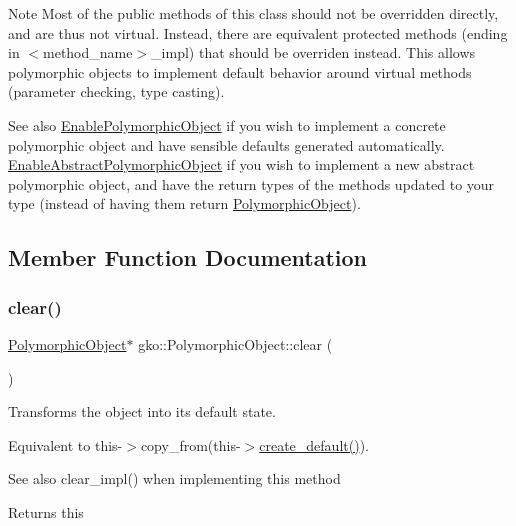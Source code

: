 \begin{DoxyNote}{Note}
Most of the public methods of this class should not be overridden directly, and are thus not virtual. Instead, there are equivalent protected methods (ending in $<$method\+\_\+name$>$\+\_\+impl) that should be overriden instead. This allows polymorphic objects to implement default behavior around virtual methods (parameter checking, type casting).
\end{DoxyNote}
\begin{DoxySeeAlso}{See also}
\hyperlink{classgko_1_1EnablePolymorphicObject}{Enable\+Polymorphic\+Object} if you wish to implement a concrete polymorphic object and have sensible defaults generated automatically. \hyperlink{classgko_1_1EnableAbstractPolymorphicObject}{Enable\+Abstract\+Polymorphic\+Object} if you wish to implement a new abstract polymorphic object, and have the return types of the methods updated to your type (instead of having them return \hyperlink{classgko_1_1PolymorphicObject}{Polymorphic\+Object}). 
\end{DoxySeeAlso}


\subsection{Member Function Documentation}
\mbox{\label{classgko_1_1PolymorphicObject_a8bb6f9995e8166099ca3ecab51d98df5}} 
\subsubsection{\texorpdfstring{clear()}{clear()}}
{\footnotesize\ttfamily \hyperlink{classgko_1_1PolymorphicObject}{Polymorphic\+Object}$\ast$ gko\+::\+Polymorphic\+Object\+::clear (\begin{DoxyParamCaption}{ }\end{DoxyParamCaption})}



Transforms the object into its default state. 

Equivalent to {\ttfamily this-\/$>$copy\+\_\+from(this-\/$>$\hyperlink{classgko_1_1PolymorphicObject_aca2ad91eee15e667cc0e7d1444a6de47}{create\+\_\+default()})}.

\begin{DoxySeeAlso}{See also}
clear\+\_\+impl() when implementing this method
\end{DoxySeeAlso}
\begin{DoxyReturn}{Returns}
this 
\end{DoxyReturn}
\mbox{\label{classgko_1_1PolymorphicObject_ada90b9acf2e6b3201a9b2e09ac56217f}} 
